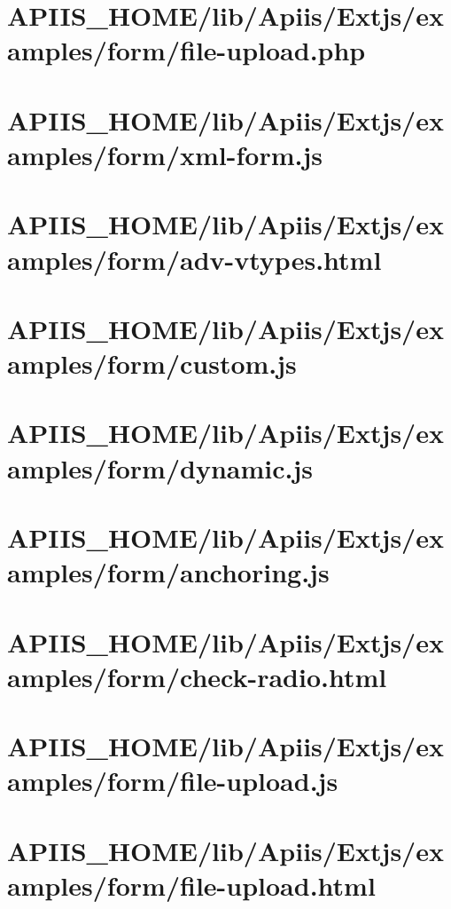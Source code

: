 \section{APIIS\_HOME/lib/Apiis/Extjs/examples/form/file-upload.php} 
\section{APIIS\_HOME/lib/Apiis/Extjs/examples/form/xml-form.js} 
\section{APIIS\_HOME/lib/Apiis/Extjs/examples/form/adv-vtypes.html} 
\section{APIIS\_HOME/lib/Apiis/Extjs/examples/form/custom.js} 
\section{APIIS\_HOME/lib/Apiis/Extjs/examples/form/dynamic.js} 
\section{APIIS\_HOME/lib/Apiis/Extjs/examples/form/anchoring.js} 
\section{APIIS\_HOME/lib/Apiis/Extjs/examples/form/check-radio.html} 
\section{APIIS\_HOME/lib/Apiis/Extjs/examples/form/file-upload.js} 
\section{APIIS\_HOME/lib/Apiis/Extjs/examples/form/file-upload.html} 
